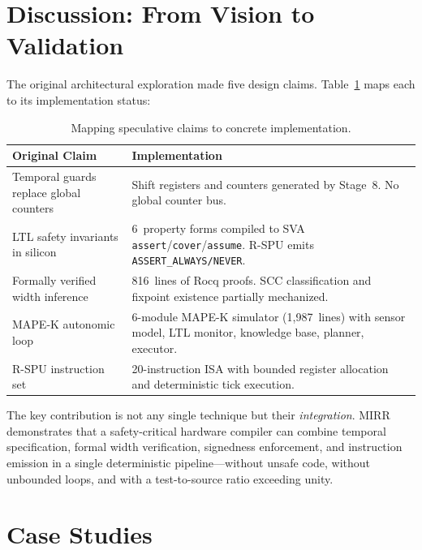 \documentclass[conference]{IEEEtran}
\begin{document}
\section{Discussion: From Vision to Validation}\label{sec:vision}

The original architectural exploration made five design
claims.  Table~\ref{tab:claims} maps each to its implementation status:

\begin{table}[!ht]
\centering
\footnotesize
\caption{Mapping speculative claims to concrete implementation.}
\label{tab:claims}
\begin{tabular}{@{}p{2.7cm}p{4.8cm}@{}}
\toprule
\textbf{Original Claim} & \textbf{Implementation} \\
\midrule
Temporal guards replace global counters &
Shift registers and counters generated by Stage~8.  No global counter bus. \\
\midrule
LTL safety invariants in silicon &
6~property forms compiled to SVA \texttt{assert}/\texttt{cover}/\texttt{assume}.  R-SPU emits \texttt{ASSERT\_ALWAYS/NEVER}. \\
\midrule
Formally verified width inference &
816~lines of Rocq proofs.  SCC classification and fixpoint existence partially mechanized. \\
\midrule
MAPE-K autonomic loop &
6-module MAPE-K simulator (1,987~lines) with sensor model, LTL monitor, knowledge base, planner, executor. \\
\midrule
R-SPU instruction set &
20-instruction ISA with bounded register allocation and deterministic tick execution. \\
\bottomrule
\end{tabular}
\end{table}

The key contribution is not any single technique but their
\emph{integration}.  MIRR demonstrates that a safety-critical hardware
compiler can combine temporal specification, formal width verification,
signedness enforcement, and instruction emission in a single
deterministic pipeline---without unsafe code, without unbounded loops,
and with a test-to-source ratio exceeding unity.

\section{Case Studies}\label{sec:casestudies}
\end{document}
